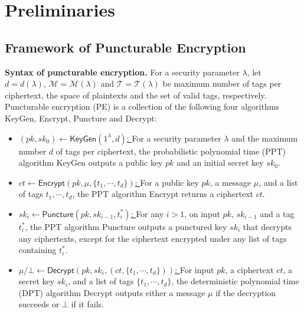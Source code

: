 \documentclass[runningheads,10pt]{llncs}
\begin{document}
\section{Preliminaries} \label{pre}
\subsection{Framework of Puncturable Encryption } \label{peer}

\noindent \textbf{Syntax of puncturable encryption.} 
For a security parameter $\lambda$, let $d=d(\lambda)$, $\mathcal{M}=\mathcal{M}(\lambda)$ and $\mathcal{T}=\mathcal{T}(\lambda)$ be maximum number of tags per ciphertext,  the space of plaintexts and the set of valid tags, respectively.  
Puncturable encryption (PE)  is a collection of the following four algorithms 
\textsf{KeyGen}, \textsf{Encrypt}, \textsf{Puncture} and \textsf{Decrypt}:
\begin{itemize}
	\item \underline{$(pk, sk_0) \leftarrow \textsf{KeyGen}(1^\lambda, d)$: }
	For a security parameter $\lambda$ and
	the maximum number $d$ of tags per ciphertext, 
	the probabilistic polynomial time (PPT) algorithm \textsf{KeyGen} outputs a public key $pk$ and an initial secret key $sk_0$. 
	
	\item  \underline{ $ct \leftarrow \textsf{Encrypt}(pk,\mu, \{t_1, \cdots, t_d\})$: }
	For a public key $pk$, a message $\mu$, and a list of tags $t_1, \cdots, t_d$, 
	the PPT algorithm \textsf{Encrypt} returns a ciphertext $ct$.  
	
	\item  \underline{$sk_{i} \leftarrow \textsf{Puncture}(pk, sk_{i-1}, t^*_{i})$: }
	For any $i>1$, 
	on input $pk$, $sk_{i-1}$ and a tag $t^*_i$, the PPT algorithm \textsf{Puncture} outputs a punctured key $sk_{i}$ 
	that decrypts any ciphertexts, except for the ciphertext encrypted under any list of tags containing $t^*_i$.
	\item  \underline{ $\mu/\bot \leftarrow \textsf{Decrypt}(pk, sk_{i},(ct, \{t_1, \cdots, t_d\}))$: }
	For input $pk$, a ciphertext $ct$, a secret key $sk_{i}$, and a list of tags $\{t_1, \cdots, t_d\}$, 
	the deterministic polynomial time (DPT) algorithm \textsf{Decrypt} outputs either a message $\mu$ if the decryption succeeds or $\bot$ if it fails.
\end{itemize}
\end{document}
